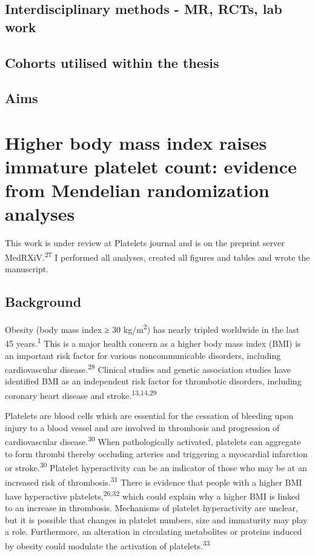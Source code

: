 \documentclass[11pt,twoside]{bristolthesis}
\begin{document}
\hypertarget{interdisciplinary-methods---mr-rcts-lab-work}{%
\section{Interdisciplinary methods - MR, RCTs, lab work}\label{interdisciplinary-methods---mr-rcts-lab-work}}

\hypertarget{cohorts-utilised-within-the-thesis}{%
\section{Cohorts utilised within the thesis}\label{cohorts-utilised-within-the-thesis}}

\hypertarget{aims}{%
\section{Aims}\label{aims}}

\hypertarget{BMI-platelets-INTERVAL}{%
\chapter{Higher body mass index raises immature platelet count: evidence from Mendelian randomization analyses}\label{BMI-platelets-INTERVAL}}

This work is under review at Platelets journal and is on the preprint server MedRXiV.\textsuperscript{27} I performed all analyses, created all figures and tables and wrote the manuscript.

\hypertarget{background-1}{%
\section{Background}\label{background-1}}

Obesity (body mass index ≥ 30 kg/m\textsuperscript{2}) has nearly tripled worldwide in the last 45 years.\textsuperscript{1} This is a major health concern as a higher body mass index (BMI) is an important risk factor for various noncommunicable disorders, including cardiovascular disease.\textsuperscript{28} Clinical studies and genetic association studies have identified BMI as an independent risk factor for thrombotic disorders, including coronary heart disease and stroke.\textsuperscript{13,14,29}

Platelets are blood cells which are essential for the cessation of bleeding upon injury to a blood vessel and are involved in thrombosis and progression of cardiovascular disease.\textsuperscript{30} When pathologically activated, platelets can aggregate to form thrombi thereby occluding arteries and triggering a myocardial infarction or stroke.\textsuperscript{30} Platelet hyperactivity can be an indicator of those who may be at an increased risk of thrombosis.\textsuperscript{31} There is evidence that people with a higher BMI have hyperactive platelets,\textsuperscript{26,32} which could explain why a higher BMI is linked to an increase in thrombosis. Mechanisms of platelet hyperactivity are unclear, but it is possible that changes in platelet numbers, size and immaturity may play a role. Furthermore, an alteration in circulating metabolites or proteins induced by obesity could modulate the activation of platelets.\textsuperscript{33}
\end{document}
